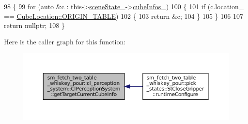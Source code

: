 \begin{DoxyCode}
98             \{
99                 \textcolor{keywordflow}{for} (\textcolor{keyword}{auto} &c : this->\hyperlink{classsm__fetch__two__table__whiskey__pour_1_1cl__perception__system_1_1ClPerceptionSystem_af60dc69df392f4bb2aae7220dd0ff847}{sceneState\_}->\hyperlink{classsm__fetch__two__table__whiskey__pour_1_1cl__perception__system_1_1CpSceneState_a8106a20f8f9a385835a39f6fb2960165}{cubeInfos\_})
100                 \{
101                     \textcolor{keywordflow}{if} (c.location\_ == \hyperlink{namespacesm__fetch__two__table__whiskey__pour_1_1cl__perception__system_a7523acd4abcc84c78d6a15965f9c25b9ae5ee34c3ef8ec4a46a00a218416c7b1d}{CubeLocation::ORIGIN\_TABLE})
102                     \{
103                         \textcolor{keywordflow}{return} &c;
104                     \}
105                 \}
106 
107                 \textcolor{keywordflow}{return} \textcolor{keyword}{nullptr};
108             \}
\end{DoxyCode}
Here is the caller graph for this function\+:
\nopagebreak
\begin{figure}[H]
\begin{center}
\leavevmode
\includegraphics[width=350pt]{classsm__fetch__two__table__whiskey__pour_1_1cl__perception__system_1_1ClPerceptionSystem_a09899882cdea9c265e98881bb903882b_icgraph}
\end{center}
\end{figure}
\mbox{\label{classsm__fetch__two__table__whiskey__pour_1_1cl__perception__system_1_1ClPerceptionSystem_a2deba9a5465a6223d40c0f1028c31fe6}} 
